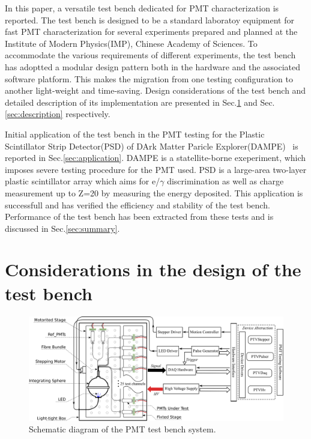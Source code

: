 \documentclass[5p, times]{elsarticle}
\begin{document}
In this paper, a versatile test bench dedicated for PMT characterization is reported.
The test bench is designed to be a standard laboratoy equipment for fast PMT characterization for several experiments prepared and planned at the Institute of Modern Physics(IMP), Chinese Academy of Sciences.
To accommodate the various requirements of different experiments, the test bench has adoptted a modular design pattern both in the hardware and the associated software platform.
This makes the migration from one testing configuration to another light-weight and time-saving.
Design considerations of the test bench and detailed description of its implementation are presented in Sec.\ref{sec:design_consideration} and Sec.\ref{sec:description} respectively.

Initial application of the test bench in the PMT testing for the Plastic Scintillator Strip Detector(PSD) of DArk Matter Paricle Explorer(DAMPE)~\cite{Chang_Jin_dampe} is reported in Sec.\ref{sec:application}.
DAMPE is a statellite-borne  exeperiment, which imposes severe testing procedure for the PMT used.
PSD is a large-area two-layer plastic scintillator array which aims for  e/$\gamma$ discrimination as well as charge measurement up to Z=20 by measuring the energy deposited.
This application is successfull and has verified the efficiency and stability of the test bench.
Performance of the test bench has been extracted from these tests and is discussed in Sec.\ref{sec:summary}.

\section{Considerations in the design of the test bench}
\label{sec:design_consideration}
\begin{figure}
 \centering
 \includegraphics[width=160mm]{testbench_overview}
\caption{Schematic diagram of the PMT test bench system.}
\label{fig:testbench_overveiw}
\end{figure}
\end{document}
